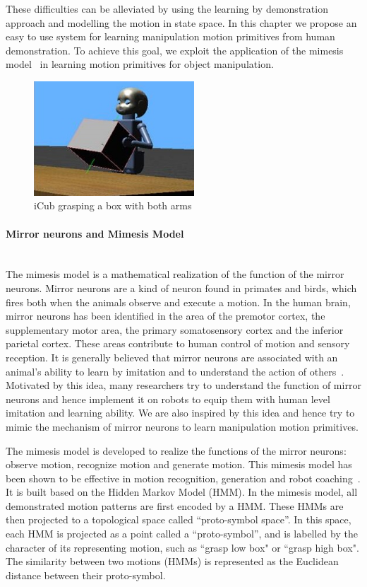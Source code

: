 These difficulties can be alleviated by using the learning by demonstration approach and modelling the motion in state space. In this chapter we propose an easy to use system for learning manipulation motion primitives from human demonstration. To achieve this goal, we exploit the application of the mimesis model~\citep{inamura2004embodied} in learning motion primitives for object manipulation.

\begin{figure}
  \centering
  \includegraphics[width=6cm]{./fig_cha5/begin.jpg}
  \caption{{iCub grasping a box with both arms}
}
    \label{begin}
\end{figure}



\paragraph{Mirror neurons and Mimesis Model} ~\\
The mimesis model is a mathematical realization of the function of the mirror neurons. Mirror neurons are a kind of neuron found in primates and birds, which fires both when the animals observe and execute a motion. In the human brain, mirror neurons has been identified
in the area of the premotor cortex, the supplementary motor area, the primary somatosensory cortex and the inferior parietal cortex. These areas contribute to human control of motion and sensory reception. It is generally believed that mirror neurons are associated with an animal's ability to learn by imitation and to understand the action of others~\citep{rizzolatti2004mirror}. Motivated by this idea, many researchers try to understand the function of mirror neurons and hence implement it on robots to equip them with human level imitation and learning ability. We are also inspired by this idea and hence try to mimic the mechanism of mirror neurons to learn manipulation motion primitives.

The mimesis model is developed to realize the functions of the mirror neurons: observe motion, recognize motion and generate motion.
This mimesis model has been shown to be effective in motion recognition, generation and robot coaching~\citep{inamura2008geometric,okuno2011motion}. It is built based on the Hidden Markov Model (HMM).
In the mimesis model, all demonstrated motion patterns are first encoded by a HMM. These HMMs are then projected to a topological space called ``proto-symbol space''. In this space, each HMM is projected as a point called a ``proto-symbol'', and is labelled by the character of its representing motion, such as ``grasp low box" or ``grasp high box". The similarity between two motions (HMMs) is represented as the Euclidean distance between their proto-symbol.

